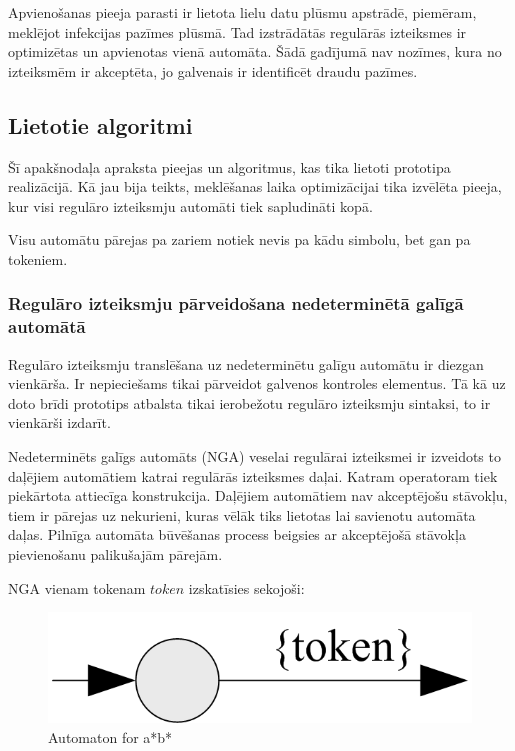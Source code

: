 Apvienošanas pieeja parasti ir lietota lielu datu plūsmu apstrādē, piemēram, meklējot infekcijas pazīmes plūsmā. Tad izstrādātās regulārās izteiksmes ir optimizētas un apvienotas vienā automāta. Šādā gadījumā nav nozīmes, kura no izteiksmēm ir akceptēta, jo galvenais ir identificēt draudu pazīmes. 

\subsection{\label{subsec:solution_algorithms}Lietotie algoritmi}

Šī apakšnodaļa apraksta pieejas un algoritmus, kas tika lietoti prototipa realizācijā. Kā jau bija teikts, meklēšanas laika optimizācijai tika izvēlēta pieeja, kur visi regulāro izteiksmju automāti tiek sapludināti kopā.

Visu automātu pārejas pa zariem notiek nevis pa kādu simbolu, bet gan pa tokeniem.

\subsubsection{Regulāro izteiksmju pārveidošana nedeterminētā galīgā automātā}

Regulāro izteiksmju translēšana uz nedeterminētu galīgu automātu ir diezgan vienkārša. Ir nepieciešams tikai pārveidot galvenos kontroles elementus. Tā kā uz doto brīdi prototips atbalsta tikai ierobežotu regulāro izteiksmju sintaksi, to ir vienkārši izdarīt.

Nedeterminēts galīgs automāts (NGA) veselai regulārai izteiksmei ir izveidots to daļējiem automātiem katrai regulārās izteiksmes daļai. Katram operatoram tiek piekārtota attiecīga konstrukcija. Daļējiem automātiem nav akceptējošu stāvokļu, tiem ir pārejas uz nekurieni, kuras vēlāk tiks lietotas lai savienotu automāta daļas. Pilnīga automāta būvēšanas process beigsies ar akceptējošā stāvokļa pievienošanu palikušajām pārejām.

NGA vienam tokenam ${token}$ izskatīsies sekojoši:
\begin{figure}[h]
  \centering
    \includegraphics[scale=1.5]{pictures/auto_token_1}
  \caption{Automaton for a*b*}
  \label{fig:automaton_aastbast}
\end{figure}

